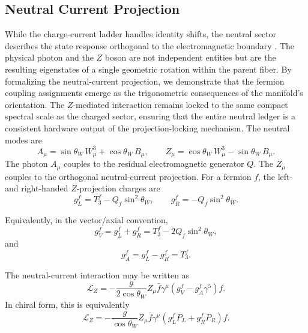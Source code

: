 \documentclass[11pt]{article}
\begin{document}
\subsection{Neutral Current Projection}
\label{sec:pr2_neutral_current_projection}

While the charge-current ladder handles identity shifts, the neutral sector describes the state response orthogonal to the electromagnetic boundary \cite{Glashow1961}. The physical photon and the $Z$ boson are not independent entities but are the resulting eigenstates of a single geometric rotation within the parent fiber. By formalizing the neutral-current projection, we demonstrate that the fermion coupling assignments emerge as the trigonometric consequences of the manifold's orientation. The $Z$-mediated interaction remains locked to the same compact spectral scale as the charged sector, ensuring that the entire neutral ledger is a consistent hardware output of the projection-locking mechanism. The neutral modes are
\begin{equation}
A_\mu
=
\sin\theta_W\,W_\mu^3
+
\cos\theta_W\,B_\mu,
\qquad
Z_\mu
=
\cos\theta_W\,W_\mu^3
-
\sin\theta_W\,B_\mu.
\end{equation}
The photon \(A_\mu\) couples to the residual electromagnetic generator \(Q\). 
The \(Z_\mu\) couples to the orthogonal neutral-current projection. For a fermion \(f\), the left- and right-handed \(Z\)-projection charges are
\begin{equation}
g_L^f
=
T_3^f
-
Q_f\sin^2\theta_W,
\qquad
g_R^f
=
-
Q_f\sin^2\theta_W.
\end{equation}

Equivalently, in the vector/axial convention,
\begin{equation}
g_V^f
=
g_L^f+g_R^f
=
T_3^f
-
2Q_f\sin^2\theta_W,
\end{equation}
and
\begin{equation}
g_A^f
=
g_L^f-g_R^f
=
T_3^f.
\end{equation}

The neutral-current interaction may be written as
\begin{equation}
\boxed{
\mathcal L_Z
=
-\frac{g}{2\cos\theta_W}
Z_\mu
\bar f
\gamma^\mu
\left(
g_V^f
-
g_A^f\gamma^5
\right)
f.
}
\end{equation}
In chiral form, this is equivalently
\begin{equation}
\boxed{
\mathcal L_Z
=
-\frac{g}{\cos\theta_W}
Z_\mu
\bar f\gamma^\mu
\left(
g_L^fP_L
+
g_R^fP_R
\right)
f.
}
\end{equation}
\end{document}
